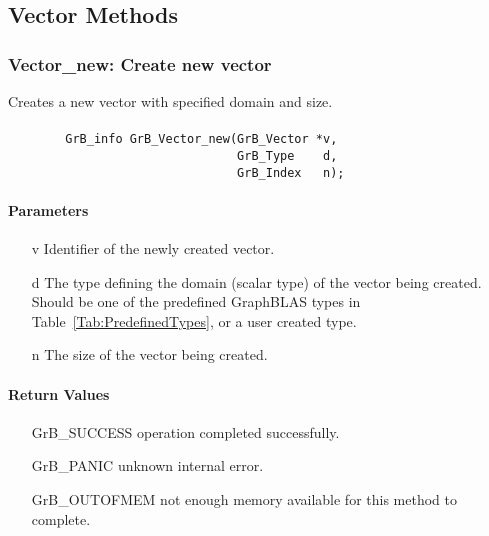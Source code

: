 \subsection{Vector Methods}



\subsubsection{{\sf Vector\_new}: Create new vector}

Creates a new vector with specified domain and size.

\paragraph{\syntax}

\begin{verbatim}
        GrB_info GrB_Vector_new(GrB_Vector *v,
                                GrB_Type    d,
                                GrB_Index   n);
\end{verbatim}

\paragraph{Parameters}

\begin{itemize}[leftmargin=1.1in]
    \item[{\sf v}] Identifier of the newly created vector.
    \item[{\sf d}] The type defining the domain (scalar type) of the vector being created.
    Should be one of the predefined
    GraphBLAS types in Table~\ref{Tab:PredefinedTypes}, or a user created type.
    \item[{\sf n}] The size of the vector being created.  
\end{itemize}

\paragraph{Return Values}

\begin{itemize}[leftmargin=2.1in]
\item[{\sf GrB\_SUCCESS}]    operation completed successfully. \\
\item[{\sf GrB\_PANIC}]      unknown internal error. \\
\item[{\sf GrB\_OUTOFMEM}]   not enough memory available for this method to complete. \\
\end{itemize}

